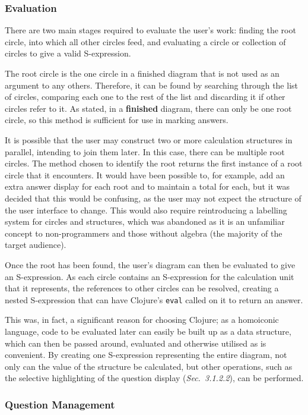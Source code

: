 \documentclass[12pt,twoside,notitlepage,xetex]{report}
\begin{document}
\subsubsection{Evaluation}

There are two main stages required to evaluate the user's work: finding the root circle, into which all other circles feed, and evaluating a circle or collection of circles to give a valid S-expression.

The root circle is the one circle in a finished diagram that is not used as an argument to any others.  Therefore, it can be found by searching through the list of circles, comparing each one to the rest of the list and discarding it if other circles refer to it.  As stated, in a {\bf finished} diagram, there can only be one root circle, so this method is sufficient for use in marking answers.

It is possible that the user may construct two or more calculation structures in parallel, intending to join them later.  In this case, there can be multiple root circles.  The method chosen to identify the root returns the first instance of a root circle that it encounters.  It would have been possible to, for example, add an extra answer display for each root and to maintain a total for each, but it was decided that this would be confusing, as the user may not expect the structure of the user interface to change.  This would also require reintroducing a labelling system for circles and structures, which was abandoned as it is an unfamiliar concept to non-programmers and those without algebra (the majority of the target audience).

Once the root has been found, the user's diagram can then be evaluated to give an S-expression.  As each circle contains an S-expression for the calculation unit that it represents, the references to other circles can be resolved, creating a nested S-expression that can have Clojure's \verb¬eval¬ called on it to return an answer.

This was, in fact, a significant reason for choosing Clojure; as a homoiconic language, code to be evaluated later can easily be built up as a data structure, which can then be passed around, evaluated and otherwise utilised as is convenient.  By creating one S-expression representing the entire diagram, not only can the value of the structure be calculated, but other operations, such as the selective highlighting of the question display (\emph{Sec.~3.1.2.2}), can be performed.

\subsubsection{Question Management}
\end{document}

